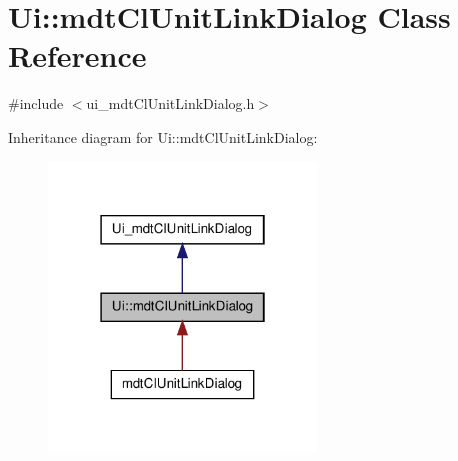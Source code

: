 \hypertarget{class_ui_1_1mdt_cl_unit_link_dialog}{\section{Ui\-:\-:mdt\-Cl\-Unit\-Link\-Dialog Class Reference}
\label{class_ui_1_1mdt_cl_unit_link_dialog}
}


{\ttfamily \#include $<$ui\-\_\-mdt\-Cl\-Unit\-Link\-Dialog.\-h$>$}



Inheritance diagram for Ui\-:\-:mdt\-Cl\-Unit\-Link\-Dialog\-:
\nopagebreak
\begin{figure}[H]
\begin{center}
\leavevmode
\includegraphics[width=202pt]{class_ui_1_1mdt_cl_unit_link_dialog__inherit__graph}
\end{center}
\end{figure}


